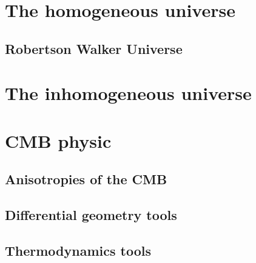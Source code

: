 \documentclass[12pt,a4paper]{book}
\begin{document}
\frontmatter 

\null\thispagestyle{empty}
\newpage

 
\tableofcontents

\mainmatter
\part{The homogeneous universe}
\chapter{Robertson Walker Universe}



\part{The inhomogeneous universe}

\part{CMB physic}
\chapter{Anisotropies of the CMB}




\appendix
\chapter{Differential geometry tools}

\chapter{Thermodynamics tools}



 
  
\end{document}
